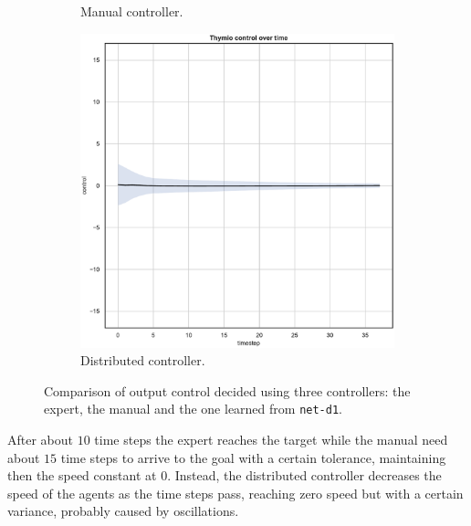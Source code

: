 \begin{figure}[!htb]
\begin{subfigure}[h]{0.3\textwidth}
		\caption{Manual controller.}
	\end{subfigure}
	\hfill
	\begin{subfigure}[h]{0.3\textwidth}
		\centering
		\includegraphics[width=\textwidth]{contents/images/net-d1/control-overtime-learned_distributed}
		\caption{Distributed controller.}
	\end{subfigure}
	\caption[Evaluation of the control learned by \texttt{net-d1}.]{Comparison 
		of output control decided using three controllers: the expert, the manual 
		and the one learned from \texttt{net-d1}.}
	\label{fig:net-d1control}
\end{figure}
After about $10$ time steps the expert reaches the target while the manual need 
about $15$ time steps to arrive to the goal with a certain tolerance, maintaining 
then the speed constant at $0$. Instead, the distributed controller decreases the 
speed of the agents as the time steps pass, reaching zero speed but with a certain 
variance, probably caused by oscillations.

